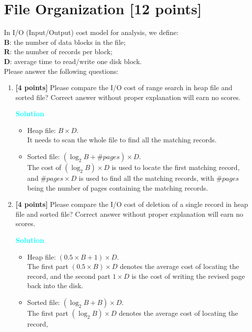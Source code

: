 \documentclass[10pt]{article}
\newenvironment{solution}
    { \begin{mdframed}[backgroundcolor=gray!10] \textcolor{cyan}{\textbf{Solution}} \\}
    {  \end{mdframed}}
\begin{document}
\newpage
\section{File Organization \textbf{[12 points]}}
In I/O (Input/Output) cost model for analysis, we define: \\
\textbf{B}: the number of data blocks in the file;\\
\textbf{R}: the number of records per block;\\
\textbf{D}: average time to read/write one disk block.\\
Please answer the following questions:
\begin{enumerate}
	\item \textbf{[4 points]}
	Please compare the I/O cost of range search in heap file and sorted file? Correct answer without proper explanation will earn no scores.  \\
	\begin{solution}
		\begin{itemize}
			\item Heap file: $B \times D$. \\
			It needs to scan the whole file to find all the matching records.
			\item Sorted file: $(\log_2 B + \#pages) \times D$. \\
			The cost of $(\log_2 B) \times D$ is used to locate the first matching record, 
			and $\#pages \times D$ is used to find all the matching records, with $\#pages$ being the number of pages containing the matching records. 
		\end{itemize}
	\end{solution}
	\item \textbf{[4 points]}
	Please compare the I/O cost of deletion of a single record in heap file and sorted file? Correct answer without proper explanation will earn no scores.  \\
	\begin{solution}
		\begin{itemize}
			\item Heap file: $(0.5 \times B + 1) \times D$.\\
			The first part $(0.5 \times B ) \times D$ denotes the average cost of locating the record, 
			and the second part $1 \times D$ is the cost of writing the revised page back into the disk. 
			\item Sorted file: $(\log_2 B + B) \times D$. \\
			The first part $(\log_2 B) \times D$ denotes the average cost of locating the record, 

\end{itemize}
\end{solution}
\end{enumerate}
\end{document}
